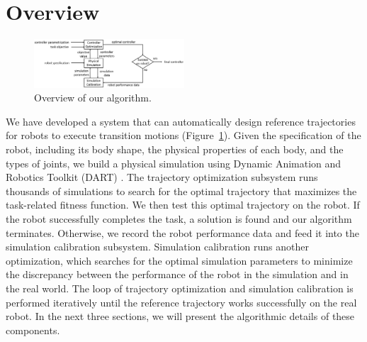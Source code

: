 \section{Overview}

\begin{figure}[!t]
  \centering
  \includegraphics[width=0.5\textwidth]{figures/controllerTransfer}
  \caption{Overview of our algorithm.}
  \vspace{-0.1in}
  \label{fig:controllerTransferOverview}
\end{figure}

We have developed a system that can automatically design reference trajectories for robots to execute transition motions (Figure~\ref{fig:controllerTransferOverview}). Given the specification of the robot, including its body shape, the physical properties of each body, and the types of joints, we build a physical simulation using Dynamic Animation and Robotics Toolkit (DART) \cite{dart:2012}. The trajectory optimization subsystem runs thousands of simulations to search for the optimal trajectory that maximizes the task-related fitness function. We then test this optimal trajectory on the robot. If the robot successfully completes the task, a solution is found and our algorithm terminates. Otherwise, we record the robot performance data and feed it into the simulation calibration subsystem. Simulation calibration runs another optimization, which searches for the optimal simulation parameters to minimize the discrepancy between the performance of the robot in the simulation and in the real world. The loop of trajectory optimization and simulation calibration is performed iteratively until the reference trajectory works successfully on the real robot. In the next three sections, we will present the algorithmic details of these components.
